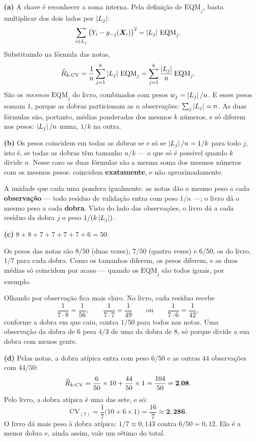 \begin{solucao}
\textbf{(a)} A chave é reconhecer a soma interna. Pela definição de $\mathrm{EQM}_j$,
basta multiplicar dos dois lados por $\left\lvert L_j \right\rvert$:
\[
  \sum_{i\in L_j}\big(Y_i-g_{-j}(\bm{X}_i)\big)^2=\left\lvert L_j \right\rvert\,\mathrm{EQM}_j .
\]
Substituindo na fórmula das notas,
\[
  \widehat{R}_{k\text{-CV}}
   =\frac1n\sum_{j=1}^{k}\left\lvert L_j \right\rvert\,\mathrm{EQM}_j
   =\sum_{j=1}^{k}\frac{\left\lvert L_j \right\rvert}{n}\,\mathrm{EQM}_j .
\]
São os \emph{mesmos} $\mathrm{EQM}_j$ do livro, combinados com pesos
$w_j=\left\lvert L_j \right\rvert/n$. E esses pesos somam $1$, porque as dobras particionam as $n$
observações: $\sum_j\left\lvert L_j \right\rvert=n$. As duas fórmulas são, portanto, médias ponderadas dos
mesmos $k$ números, e só diferem nos pesos: $\left\lvert L_j \right\rvert/n$ numa, $1/k$ na outra.

\smallskip
\textbf{(b)} Os pesos coincidem em todas as dobras se e só se $\left\lvert L_j \right\rvert/n=1/k$ para todo
$j$, isto é, se todas as dobras têm tamanho $n/k$ --- o que só é possível quando $k$
divide $n$. Nesse caso as duas fórmulas são a mesma soma dos mesmos números com os
mesmos pesos: coincidem \textbf{exatamente}, e não aproximadamente.

A unidade que cada uma pondera igualmente: as notas dão o mesmo peso a cada
\textbf{observação} --- todo resíduo de validação entra com peso $1/n$ ---; o livro dá o
mesmo peso a cada \textbf{dobra}. Visto do lado das observações, o livro dá a cada
resíduo da dobra $j$ o peso $1/(k\left\lvert L_j \right\rvert)$.

\smallskip
\textbf{(c)} $8+8+7+7+7+7+6=50$.

Os pesos das notas são $8/50$ (duas vezes), $7/50$ (quatro vezes) e $6/50$; os do
livro, $1/7$ para cada dobra. Como os tamanhos diferem, os pesos diferem, e as duas
médias só coincidem por acaso --- quando os $\mathrm{EQM}_j$ são todos iguais, por
exemplo.

Olhando por observação fica mais claro. No livro, cada resíduo recebe
\[
  \frac{1}{7\cdot8}=\frac1{56},\qquad
  \frac{1}{7\cdot7}=\frac1{49}\qquad\text{ou}\qquad
  \frac{1}{7\cdot6}=\frac1{42},
\]
conforme a dobra em que caiu, contra $1/50$ para todos nas notas. Uma observação da
dobra de $6$ pesa $4/3$ de uma da dobra de $8$, só porque divide a sua dobra com menos
gente.

\smallskip
\textbf{(d)} Pelas notas, a dobra atípica entra com peso $6/50$ e as outras $44$
observações com $44/50$:
\[
  \widehat{R}_{k\text{-CV}}=\frac{6}{50}\times10+\frac{44}{50}\times1=\frac{104}{50}=\mathbf{2{,}08}.
\]
Pelo livro, a dobra atípica é uma das sete, e só:
\[
  \mathrm{CV}_{(7)}=\frac17\big(10+6\times1\big)=\frac{16}{7}\approx\mathbf{2{,}286}.
\]
O livro dá mais peso à dobra atípica: $1/7\approx0{,}143$ contra $6/50=0{,}12$. Ela é a
menor dobra e, ainda assim, vale um sétimo do total.


\end{solucao}
